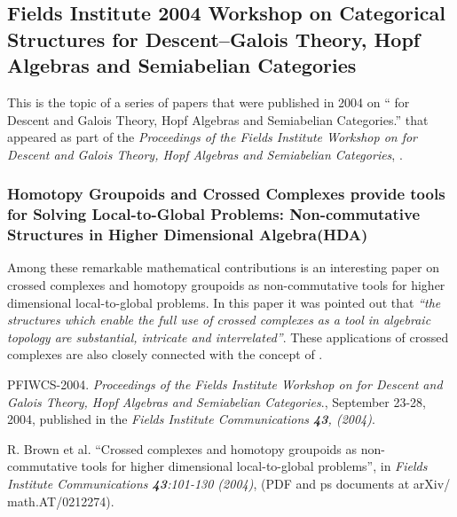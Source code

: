 \documentclass[12pt]{article}
\begin{document}
\subsection{Fields Institute 2004 Workshop on Categorical Structures for Descent--Galois Theory, Hopf Algebras and Semiabelian Categories}

This is the topic of a series of papers that were published in 2004 on `` for Descent and Galois Theory, Hopf Algebras and Semiabelian Categories.'' that appeared
as part of the \emph{Proceedings of the Fields Institute Workshop on  for Descent and Galois Theory, Hopf Algebras and Semiabelian Categories}, \cite{FIC2004}.

\subsubsection{Homotopy Groupoids and Crossed Complexes provide tools for Solving Local-to-Global Problems: 
 Non-commutative Structures in Higher Dimensional Algebra(HDA)}

Among these remarkable mathematical contributions is an interesting paper on crossed complexes and homotopy groupoids as non-commutative tools for higher dimensional local-to-global problems. In this paper it was pointed out that
\emph{``the structures which enable the full use of crossed complexes as a tool in algebraic topology are substantial, intricate and interrelated''}. These applications of crossed complexes are also closely connected with the concept of
.


\begin{thebibliography}{9}

PFIWCS-2004. \emph{Proceedings of the Fields Institute Workshop on  for Descent and Galois Theory, Hopf Algebras and Semiabelian Categories}., September 23-28, 2004, published in the \emph{Fields Institute Communications \textbf{43}, (2004)}.

R. Brown et al. ``Crossed complexes and homotopy groupoids as non-commutative tools for higher dimensional local-to-global problems'', in \emph{Fields Institute Communications \textbf{43}:101-130 (2004)},
(PDF and ps documents at arXiv/ math.AT/0212274).

\end{thebibliography} 
\end{document}
